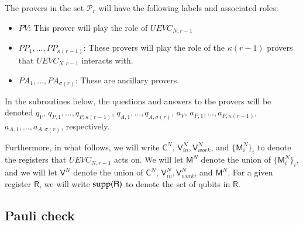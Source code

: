 \documentclass[11pt,letterpaper]{article}
\newcommand{\sC}{{\mathsf{C}}}
\newcommand{\sR}{{\mathsf{R}}}
\newcommand{\sV}{{\mathsf{V}}}
\newcommand{\sM}{{\mathsf{M}}}
\begin{document}
The provers in the set $\mathcal{P}_r$ will have the following labels and associated roles:
\begin{itemize}
	\item $PV$: This prover will play the role of $UEVC_{N,r-1}$
	\item $PP_1,\ldots,PP_{\kappa(r-1)}$: These provers will play the role of the $\kappa(r-1)$ provers that $UEVC_{N,r-1}$ interacts with.
	\item $PA_1,\ldots,PA_{\sigma(r)}$: These are ancillary provers.
\end{itemize}

In the subroutines below, the questions and answers to the provers will be denoted $q_V$, $q_{P,1},\ldots,q_{P,\kappa(r-1)}$, $q_{A,1},\ldots,q_{A,\sigma(r)}$, $a_V$, $a_{P,1},\ldots,a_{P,\kappa(r-1)}$, $a_{A,1},\ldots,a_{A,\sigma(r)}$, respectively.




Furthermore, in what follows, we will write $\sC^N$, $\sV_{in}^N,\sV_{work}^N$, and $\{ \sM_i^N \}_i$ to denote the registers that $UEVC_{N,r-1}$ acts on. We will let $\sM^N$ denote the union of $\{ \sM_i^N \}_i$, and we will let $\sV^N$ denote the union of $\sC^N$, $\sV_{in}^N,\sV_{work}^N$, and $\sM^N$. For a given register $\sR$, we will write $\supp(\sR)$ to denote the set of qubits in $\sR$.


\subsection{Pauli check}
\label{sec:pauli_check}
\end{document}
